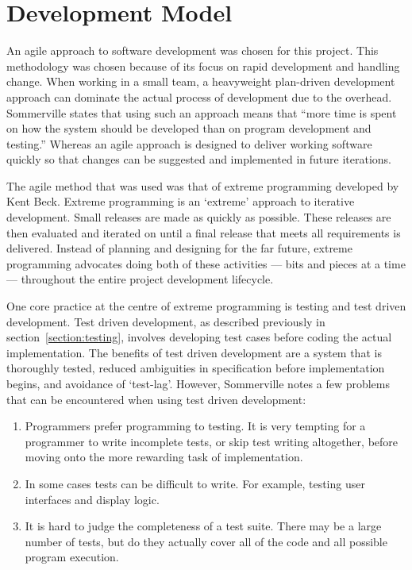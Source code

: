 \section{Development Model}
\label{section:devmodel}

An agile approach to software development was chosen for this project. This methodology was
chosen because of its focus on rapid development and handling change. When working in a small
team, a heavyweight plan-driven development approach can dominate the actual process of development
due to the overhead. Sommerville states that using such an approach means that ``more time is
spent on how the system should be developed than on program development and testing.''
Whereas an agile approach is designed to deliver working software quickly so that changes
can be suggested and implemented in future iterations.

The agile method that was used was that of extreme programming developed by Kent Beck.\cite{beck1999}\cite{beck2000}
Extreme programming is an `extreme' approach to iterative development. Small releases are made
as quickly as possible. These releases are then evaluated and iterated on until a final release
that meets all requirements is delivered. Instead of planning and designing for the far future,
extreme programming advocates doing both of these activities --- bits and pieces at a time ---
throughout the entire project development lifecycle.


One core practice at the centre of extreme programming is testing and test driven development.
Test driven development, as described previously in section~\ref{section:testing}, involves
developing test cases before coding the actual implementation. The benefits of test driven
development are a system that is thoroughly tested, reduced ambiguities in specification before
implementation begins, and avoidance of `test-lag'. However, Sommerville notes a few problems
that can be encountered when using test driven development:

\begin{enumerate}
\item Programmers prefer programming to testing. It is very tempting for a programmer to write
      incomplete tests, or skip test writing altogether, before moving onto the more rewarding
      task of implementation.

\item In some cases tests can be difficult to write. For example, testing user interfaces and
      display logic.

\item It is hard to judge the completeness of a test suite. There may be a large number of tests,
      but do they actually cover all of the code and all possible program execution.
\end{enumerate}

